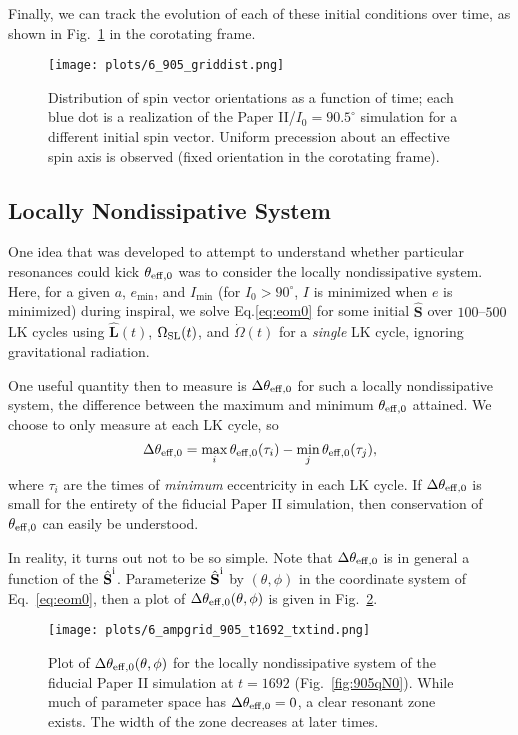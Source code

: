 \documentclass[11pt,
        usenames, %
        dvipsnames %
    ]{article}
\newcommand*{\bm}[1]{\boldsymbol{\mathbf{#1}}}
\newcommand*{\uv}[1]{\hat{\bm{#1}}}
\begin{document}
Finally, we can track the evolution of each of these initial conditions over
time, as shown in Fig.~\ref{fig:griddist_corot} in the corotating frame.
\begin{figure}
    \centering
    \texttt{[image: plots/6\_905\_griddist.png]}
    \caption{Distribution of spin vector orientations as a function of time;
    each blue dot is a realization of the Paper II/$I_0 = 90.5^\circ$ simulation
    for a different initial spin vector. Uniform precession about an effective
    spin axis is observed (fixed orientation in the corotating
    frame).}\label{fig:griddist_corot}
\end{figure}

\subsection{Locally Nondissipative System}

One idea that was developed to attempt to understand whether particular
resonances could kick $\theta_{\rm eff, 0}$ was to consider the locally
nondissipative system. Here, for a given $a$, $e_{\min}$, and $I_{\min}$ (for
$I_0 > 90^\circ$, $I$ is minimized when $e$ is minimized) during inspiral, we
solve Eq.\eqref{eq:eom0} for some initial $\uv{S}$ over $100$--$500$ LK cycles
using $\uv{L}(t)$, $\Omega_{\rm SL}(t)$, and $\dot{\Omega}(t)$ for a
\emph{single} LK cycle, ignoring gravitational radiation.

One useful quantity then to measure is $\Delta \theta_{\rm eff,0}$ for such a
locally nondissipative system, the difference between the maximum and minimum
$\theta_{\rm eff,0}$ attained. We choose to only measure at each LK cycle, so
\begin{equation}
    \Delta \theta_{\rm eff, 0} = \max\limits_i \theta_{\rm eff, 0}(\tau_i)
        - \min\limits_j \theta_{\rm eff, 0}(\tau_j),
\end{equation}
where $\tau_i$ are the times of \emph{minimum} eccentricity in each LK cycle.
If $\Delta \theta_{\rm eff, 0}$ is small for the entirety of the fiducial Paper
II simulation, then conservation of $\theta_{\rm eff, 0}$ can easily be
understood.

In reality, it turns out not to be so simple. Note that $\Delta \theta_{\rm eff,
0}$ is in general a function of the $\uv{S}^{\rm i}$. Parameterize $\uv{S}^{\rm
i}$ by $(\theta, \phi)$ in the coordinate system of Eq.~\eqref{eq:eom0}, then a
plot of $\Delta \theta_{\rm eff, 0}(\theta, \phi)$ is given in
Fig.~\ref{fig:ampgridt1692}.
\begin{figure}
    \centering
    \texttt{[image: plots/6\_ampgrid\_905\_t1692\_txtind.png]}
    \caption{Plot of $\Delta \theta_{\rm eff, 0}(\theta, \phi)$ for the locally
    nondissipative system of the fiducial Paper II simulation at $t = 1692$
    (Fig.~\ref{fig:905qN0}). While much of parameter space has $\Delta
    \theta_{\rm eff, 0} = 0$, a clear resonant zone exists. The width of the
    zone decreases at later times.}\label{fig:ampgridt1692}
\end{figure}
\end{document}
